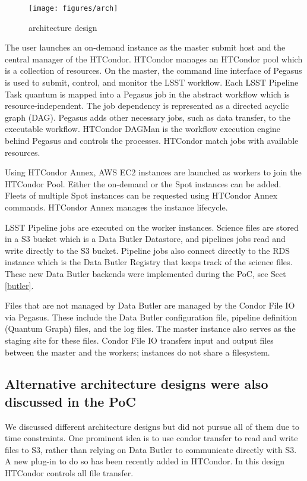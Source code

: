 \begin{figure}
  \centering
  \texttt{[image: figures/arch]}
  \label{fig:arch}
  \caption{architecture design}
\end{figure}

The user launches an on-demand instance as the master submit host and the central manager of the HTCondor.
HTCondor manages an HTCondor pool which is a collection of resources.
On the master, the command line interface of Pegasus is used to submit, control, and monitor the LSST workflow.
Each LSST Pipeline Task quantum is mapped into a Pegasus job in the abstract workflow which is resource-independent.
The job dependency is represented as a directed acyclic graph (DAG).
Pegasus adds other necessary jobs, such as data transfer, to the executable workflow.
HTCondor DAGMan is the workflow execution engine behind Pegasus and controls the processes.
HTCondor match jobs with available resources.

Using HTCondor Annex, AWS EC2 instances are launched as workers to join the HTCondor Pool.
Either the on-demand or the Spot instances can be added.
Fleets of multiple Spot instances can be requested using HTCondor Annex commands.
HTCondor Annex manages the instance lifecycle.

LSST Pipeline jobs are executed on the worker instances.
Science files are stored in a S3 bucket which is a Data Butler Datastore, and pipelines jobs read and write directly to the S3 bucket.
Pipeline jobs also connect directly to the RDS instance which is the Data Butler Registry that keeps track of the science files.
These new Data Butler backends were implemented during the PoC, see Sect \ref{butler}.

Files that are not managed by Data Butler are managed by the Condor File IO via Pegasus.
These include the Data Butler configuration file, pipeline definition (Quantum Graph) files, and the log files.
The master instance also serves as the staging site for these files.
Condor File IO transfers input and output files between the master and the workers; instances do not share a filesystem.


\subsection{Alternative architecture designs were also discussed in the PoC}

We discussed different architecture designs but did not pursue all of them due to time constraints.
One prominent idea is to use condor transfer to read and write files to S3, rather than relying on Data Butler to communicate directly with S3.
A new plug-in to do so has been recently added in HTCondor.
In this design HTCondor controls all file transfer.

